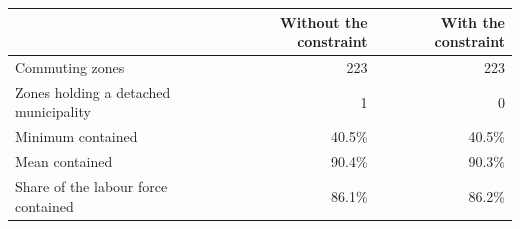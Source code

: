 \begin{tabular}{lrr}
\toprule
& Without the constraint & With the constraint \\
\midrule
Commuting zones & 223 & 223 \\
Zones holding a detached municipality & 1 & 0 \\[2pt]
Minimum contained & 40.5\% & 40.5\% \\
Mean contained & 90.4\% & 90.3\% \\
Share of the labour force contained & 86.1\% & 86.2\% \\
\bottomrule
\end{tabular}
